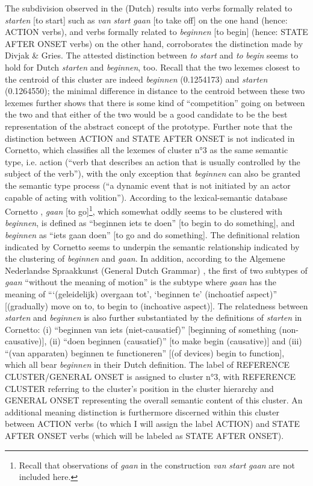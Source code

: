 The subdivision observed in the (Dutch) results into verbs formally related to \textit{starten} [to start] such as \textit{van} \textit{start} \textit{gaan} [to take off] on the one hand (hence: ACTION verbs), and verbs formally related to \textit{beginnen} [to begin] (hence: STATE AFTER ONSET verbs) on the other hand, corroborates the distinction made by Divjak \& Gries. The attested distinction between \textit{to} \textit{start} and \textit{to} \textit{begin} seems to hold for Dutch \textit{starten} and \textit{beginnen}, too. Recall that the two lexemes closest to the centroid of this cluster are indeed \textit{beginnen} (0.1254173) and \textit{starten} (0.1264550); the minimal difference in distance to the centroid between these two lexemes further shows that there is some kind of ``competition'' going on between the two and that either of the two would be a good candidate to be the best representation of the abstract concept of the prototype. Further note that the distinction between ACTION and STATE AFTER ONSET is not indicated in Cornetto, which classifies all the lexemes of cluster n°3 as the same semantic type, i.e. action (“verb that describes an action that is usually controlled by the subject of the verb”), with the only exception that \textit{beginnen} can also be granted the semantic type process (“a dynamic event that is not initiated by an actor capable of acting with volition”). According to the lexical-semantic database Cornetto \citep{vossen_cornetto_2008}, \textit{gaan} [to go]\footnote{Recall that observations of \textit{gaan} in the construction \textit{van} \textit{start} \textit{gaan} are not included here.}, which somewhat oddly seems to be clustered with \textit{beginnen}, is defined as “beginnen iets te doen” [to begin to do something], and \textit{beginnen} as “iets gaan doen” [to go and do something]. The definitional relation indicated by Cornetto seems to underpin the semantic relationship indicated by the clustering of \textit{beginnen} and \textit{gaan}. In addition, according to the Algemene Nederlandse Spraakkunst (General Dutch Grammar) \citep{haeseryn_algemene_2012}, the first of two subtypes of \textit{gaan} “without the meaning of motion” is the subtype where \textit{gaan} has the meaning of “‘(geleidelijk) overgaan tot’, ‘beginnen te’ (inchoatief aspect)” [(gradually) move on to, to begin to (inchoative aspect)]. The relatedness between \textit{starten} and \textit{beginnen} is also further substantiated by the definitions of \textit{starten} in Cornetto: (i) “beginnen van iets (niet-causatief)” [beginning of something (non-causative)], (ii) “doen beginnen (causatief)” [to make begin (causative)] and (iii) “(van apparaten) beginnen te functioneren” [(of devices) begin to function], which all bear \textit{beginnen} in their Dutch definition. The label of REFERENCE CLUSTER/GENERAL ONSET is assigned to cluster n°3, with REFERENCE CLUSTER referring to the cluster’s position in the cluster hierarchy and GENERAL ONSET representing the overall semantic content of this cluster. An additional meaning distinction is furthermore discerned within this cluster between ACTION verbs (to which I will assign the label ACTION) and STATE AFTER ONSET verbs (which will be labeled as STATE AFTER ONSET).

